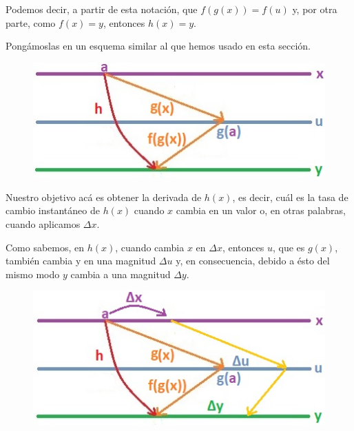 \documentclass[12pt]{article}
\begin{document}
Podemos decir, a partir de esta notación, que $f(g(x)) = f(u)$ y, por otra parte, como $f(x) = y$, entonces $h(x) = y$.

Pongámoslas en un esquema similar al que hemos usado en esta sección.

\begin{figure}[hbt!]
\centering
\includegraphics[scale=0.7]{img/intro-chain-rule-3.jpg}
\end{figure}

Nuestro objetivo acá es obtener la derivada de $h(x)$, es decir, cuál es la tasa de cambio instantáneo de $h(x)$ cuando $x$ cambia en un valor o, en otras palabras, cuando aplicamos $\Delta x$.

Como sabemos, en $h(x)$, cuando cambia $x$ en $\Delta x$, entonces $u$, que es $g(x)$, también cambia y en una magnitud $\Delta u$ y, en consecuencia, debido a ésto del mismo modo $y$ cambia a una magnitud $\Delta y$.

\begin{figure}[hbt!]
\centering
\includegraphics[scale=0.7]{img/intro-chain-rule-4.jpg}
\end{figure}
\end{document}
